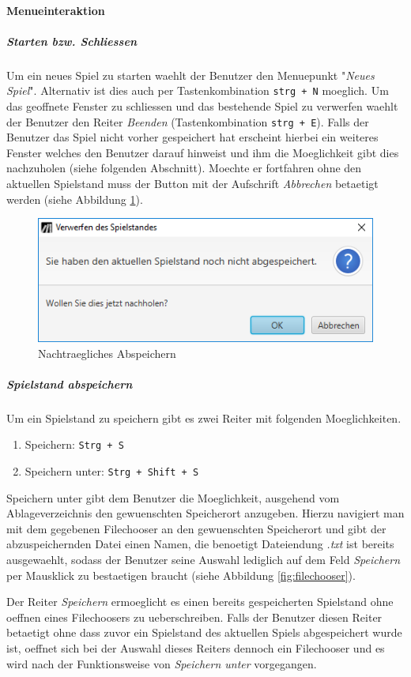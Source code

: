 \paragraph{Menueinteraktion}
\subparagraph{Starten bzw. Schliessen}
Um ein neues Spiel zu starten waehlt der Benutzer den Menuepunkt "\emph{Neues Spiel}". Alternativ ist dies auch per Tastenkombination \verb|strg + N| moeglich. Um das geoffnete Fenster zu schliessen und das bestehende Spiel zu verwerfen waehlt der Benutzer den Reiter \emph{Beenden} (Tastenkombination \verb|strg + E|). Falls der Benutzer das Spiel nicht vorher gespeichert hat erscheint hierbei ein weiteres Fenster welches den Benutzer darauf hinweist und ihm die Moeglichkeit gibt dies nachzuholen (siehe folgenden Abschnitt). Moechte er fortfahren ohne den aktuellen Spielstand muss der Button mit der Aufschrift \emph{Abbrechen} betaetigt werden (siehe Abbildung \ref{fig:nachtrSpeichern}). 

\begin{figure}
	\centering
	\includegraphics[width=.6\linewidth]{screenshots/screenshot_NachtraeglichesAbspeichern}
	\caption{Nachtraegliches Abspeichern}
	\label{fig:nachtrSpeichern}
\end{figure}

\subparagraph{Spielstand abspeichern}
\label{spar:anleitung_speichern}
Um ein Spielstand zu speichern gibt es zwei Reiter mit folgenden Moeglichkeiten.
\begin{enumerate}
	\item{Speichern: \verb|Strg + S|}
	\item{Speichern unter: \verb|Strg + Shift + S|}
\end{enumerate}
Speichern unter gibt dem Benutzer die Moeglichkeit, ausgehend vom Ablageverzeichnis den gewuenschten Speicherort anzugeben. Hierzu navigiert man mit dem gegebenen Filechooser an den gewuenschten Speicherort und gibt der abzuspeichernden Datei einen Namen, die benoetigt Dateiendung \emph{.txt} ist bereits ausgewaehlt, sodass der Benutzer seine Auswahl lediglich auf dem Feld \emph{Speichern} per Mausklick zu bestaetigen braucht (siehe Abbildung \ref{fig:filechooser}). 

Der Reiter \emph{Speichern} ermoeglicht es einen bereits gespeicherten Spielstand ohne oeffnen eines Filechoosers zu ueberschreiben. Falls der Benutzer diesen Reiter betaetigt ohne dass zuvor ein Spielstand des aktuellen Spiels abgespeichert wurde ist, oeffnet sich bei der Auswahl dieses Reiters dennoch ein Filechooser und es wird nach der Funktionsweise von \emph{Speichern unter} vorgegangen. 

